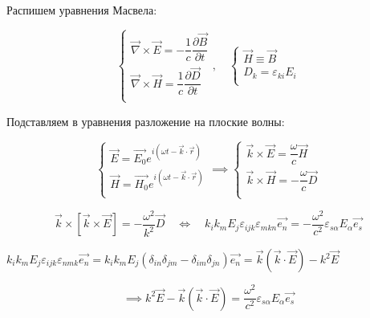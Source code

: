 \documentclass[a4paper,12pt]{article}
\begin{document}
	\quad Распишем уравнения Масвела: 
	
	\begin{equation}
		\begin{cases}
			\vec{\nabla}\times\vec{E} = -\dfrac{1}{c} \dfrac{\partial\vec{B}}{\partial t} \\
			\vec{\nabla} \times \vec{H} = \dfrac{1}{c}\dfrac{\partial\vec{D}}{\partial t} \\
		\end{cases}, \quad \begin{cases} 
			\vec{H} \equiv \vec{B} \\
			D_k = \varepsilon_{ki} E_i \\
		\end{cases}
	\end{equation}
	
	\quad Подставляем в уравнения разложение на плоские волны: 
	
	\begin{equation}
		\begin{cases}
			\vec{E} = \vec{E_0} e^{i(\omega t - \vec{k}\cdot\vec{r})} \\
			\vec{H} = \vec{H_0} e^{i(\omega t - \vec{k}\cdot\vec{r})} \\
		\end{cases} \implies \begin{cases}
			\vec{k} \times \vec{E} = \dfrac{\omega}{c} \vec{H} \\
			\vec{k} \times \vec{H} = -\dfrac{\omega}{c} \vec{D} \\
		\end{cases}
	\end{equation}
	
	\begin{equation}
		\vec{k} \times \left[\vec{k} \times \vec{E} \right] = -\dfrac{\omega^2}{k^2} \vec{D} \quad\Leftrightarrow \quad k_i k_m E_j \varepsilon_{ijk} \varepsilon_{mkn} \vec{e_n} = -\dfrac{\omega^2}{c^2} \varepsilon_{s\alpha} E_\alpha \vec{e_s}  
	\end{equation}
	
	\begin{center}
		$k_i k_m E_j \varepsilon_{ijk}\varepsilon_{nmk} \vec{e_n} = k_i k_m E_j \left(\delta_{in} \delta_{jm} - \delta_{im} \delta_{jn} \right) \vec{e_n} = \vec{k} \left(\vec{k} \cdot \vec{E}\right) - k^2 \vec{E} $
	\end{center}
	
	\begin{equation}
		\implies k^2 \vec{E} - \vec{k}\left(\vec{k}\cdot\vec{E}\right) = \dfrac{\omega^2}{c^2} \varepsilon_{s\alpha} E_\alpha \vec{e_s}
	\end{equation}
	
\end{document}
